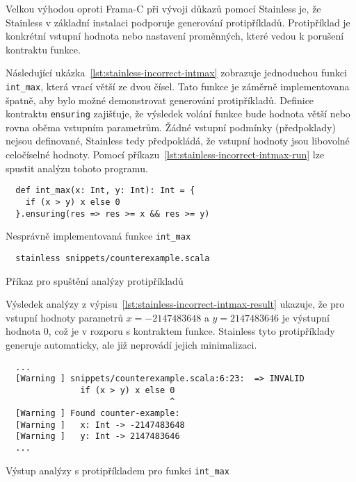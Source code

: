 Velkou výhodou oproti Frama\mbox{-}C při vývoji důkazů pomocí Stainless je,
že Stainless v základní instalaci podporuje generování protipříkladů.
Protipříklad je konkrétní vstupní hodnota nebo nastavení proměnných,
které vedou k porušení kontraktu funkce.

Následující ukázka~\ref{lst:stainless-incorrect-intmax} zobrazuje
jednoduchou funkci \texttt{int\_max}, která vrací větší ze dvou čísel.
Tato funkce je záměrně implementovana špatně,
aby bylo možné demonstrovat generování protipříkladů.
Definice kontraktu \texttt{ensuring} zajišťuje,
že výsledek volání funkce bude hodnota větší nebo rovna oběma vstupním parametrům.
Žádné vstupní podmínky (předpoklady) nejsou definované,
Stainless tedy předpokládá, že vstupní hodnoty jsou libovolné celočíselné hodnoty.
Pomocí příkazu~\ref{lst:stainless-incorrect-intmax-run}
lze spustit analýzu tohoto programu.

\begin{listing}[H]
  \begin{verbatim}
  def int_max(x: Int, y: Int): Int = {
    if (x > y) x else 0
  }.ensuring(res => res >= x && res >= y)
  \end{verbatim}
  \caption{Nesprávně implementovaná funkce \texttt{int\_max}}
  \label{lst:stainless-incorrect-intmax}
\end{listing}

\begin{listing}[H]
  \begin{verbatim}
  stainless snippets/counterexample.scala
  \end{verbatim}
  \caption{Příkaz pro spuštění analýzy protipříkladů}
  \label{lst:stainless-incorrect-intmax-run}
\end{listing}

Výsledek analýzy z výpisu~\ref{lst:stainless-incorrect-intmax-result} ukazuje,
že pro vstupní hodnoty parametrů
$x = -2147483648$ a $y = 2147483646$
je výstupní hodnota $0$, což je v rozporu s kontraktem funkce.
Stainless tyto protipříklady generuje automaticky,
ale již neprovádí jejich minimalizaci.

\begin{listing}[H]
  \begin{verbatim}
  ...
  [Warning ] snippets/counterexample.scala:6:23:  => INVALID
               if (x > y) x else 0
                                 ^
  [Warning ] Found counter-example:
  [Warning ]   x: Int -> -2147483648
  [Warning ]   y: Int -> 2147483646
  ...
  \end{verbatim}
  \caption{Výstup analýzy s protipříkladem pro funkci \texttt{int\_max}}
  \label{lst:stainless-incorrect-intmax-result}
\end{listing}

